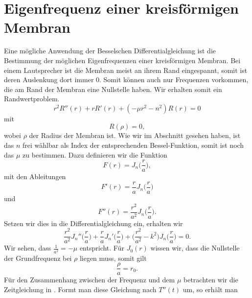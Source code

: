 \section[Eigenfrequenzen einer kreisförmigen Membram]{Eigenfrequenz einer kreisförmigen Membran}

Eine mögliche Anwendung der Besselschen Differentialgleichung ist die Bestimmung der möglichen Eigenfrequenzen einer kreisförmigen Membran. 
Bei einem Lautsprecher ist die Membran meist an ihrem Rand eingespannt, somit ist deren Auslenkung dort immer 0. Somit können auch nur Frequenzen vorkommen, die am Rand der Membran eine Nullstelle haben. Wir erhalten somit ein Randwertproblem.
\begin{equation}
r^2 R''(r) + r R'(r) + (-\mu r^2 - n^2)R(r) = 0
\label{eq:dglmitmu}
\end{equation}
mit 
\begin{equation}
R(\rho) = 0,
\end{equation}
wobei $\rho$ der Radius der Membran ist.
Wie wir im Abschnitt  gesehen haben, ist das $n$ frei wählbar als Index der entsprechenden Bessel-Funktion, somit ist noch das $\mu$ zu bestimmen. 
Dazu definieren wir die Funktion
\begin{equation}
F(r) = J_n \biggl(\frac{r}{a} \biggr),
\end{equation}
mit den Ableitungen
\begin{equation}
F'(r) = \frac{r}{a} J_n \biggl(\frac{r}{a} \biggr)
\end{equation}
und 
\begin{equation}
F''(r) = \frac{r^2}{a^2} J_n \biggl(\frac{r}{a} \biggr).
\end{equation}
Setzen wir dies in die Differentialgleichung  ein, erhalten wir
\begin{equation}
\frac{r^2}{a^2}J_n''\biggl(\frac{r}{a} \biggr) +
\frac{r}{a}J_n'\biggl(\frac{r}{a} \biggr) +
\biggl(\frac{r^2}{a^2} - k^2\biggr)J_n\biggl(\frac{r}{a}\biggr) = 0.
\label{eq:dglmitfaktor}
\end{equation}
Wir sehen, dass $\frac{1}{a^2}=-\mu$ entspricht.
Für $J_0(r)$ wissen wir, dass die Nullstelle der Grundfrequenz bei $\rho$ liegen muss, somit gilt
\begin{equation}
\frac{\rho}{a} = r_0.
\end{equation}
Für den  Zusammenhang zwischen der Frequenz und dem $\mu$ betrachten wir die Zeitgleichung in . Formt man diese Gleichung nach $T''(t)$ um, so erhält man 
